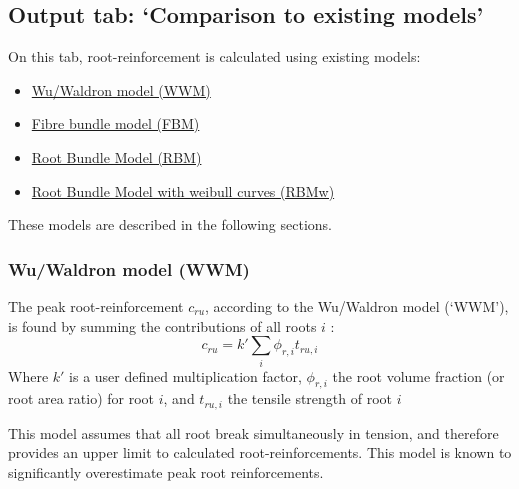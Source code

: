 \documentclass[a4 paper, 11  pt]{article}
\begin{document}
\subsection{Output tab: `Comparison to existing models'}
\label{sec:existingmodels}

On this tab, root-reinforcement is calculated using existing models:
\begin{itemize}
	\parskip=1pt
	\itemsep=0pt
	\item \hyperref[sec:wwm]{Wu/Waldron model (WWM)}
	\item \hyperref[sec:fbm]{Fibre bundle model (FBM)}
	\item \hyperref[sec:rbm]{Root Bundle Model (RBM)}
	\item \hyperref[sec:rbm]{Root Bundle Model with weibull curves (RBMw)}
\end{itemize}
These models are described in the following sections.

\subsubsection{Wu/Waldron model (WWM)}
\label{sec:wwm}
The peak root-reinforcement $c_{ru}$, according to the Wu/Waldron model (`WWM'), is found by summing the contributions of all roots $i$ \citep{waldron1977,wu1979}:
\begin{equation}
	c_{ru} = k' \sum_i \phi_{r,i} t_{ru,i}
\end{equation}
Where $k'$ is a user defined multiplication factor, $\phi_{r,i}$ the root volume fraction (or root area ratio) for root $i$, and $t_{ru,i}$ the tensile strength of root $i$

This model assumes that all root break simultaneously in tension, and therefore provides an upper limit to calculated root-reinforcements. This model is known to significantly overestimate peak root reinforcements.

\end{document}
